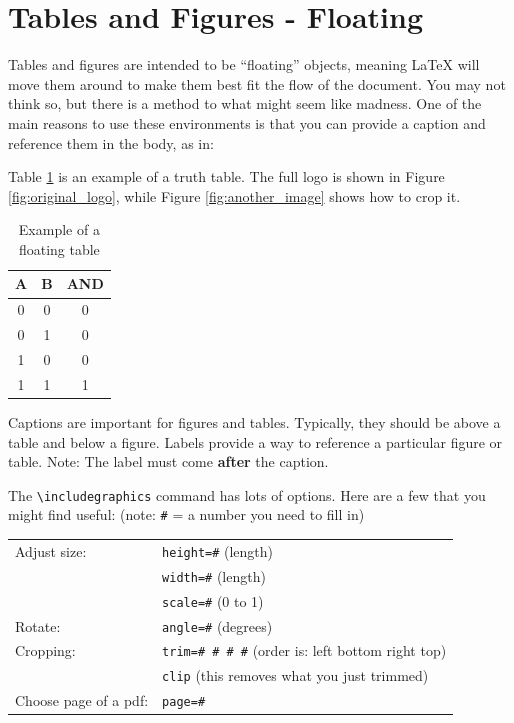 \documentclass[11pt]{article}
\begin{document}
\section*{Tables and Figures - Floating}

Tables and figures are intended to be ``floating'' objects, meaning LaTeX will move them around to make them best fit the flow of the document.  You may not think so, but there is a method to what might seem like madness. One of the main reasons to use these environments is that you can provide a caption and reference them in the body, as in: 

Table \ref{tbl:example_table} is an example of a truth table. The full logo is shown in Figure \ref{fig:original_logo}, while Figure \ref{fig:another_image} shows how to crop it.


\begin{table}[ht]\centering
	\caption{Example of a floating table}
	\label{tbl:example_table}
	\begin{tabular}{cc|c}
		\toprule
		A & B & AND \\
		\midrule
		0 & 0 & 0 \\
		0 & 1 & 0 \\
		1 & 0 & 0 \\
		1 & 1 & 1 \\
		\bottomrule
	\end{tabular} 
\end{table}

Captions are important for figures and tables.  Typically, they should be above a table and below a figure. Labels provide a way to reference a particular figure or table. Note: The label must come \textbf{after} the caption.  

The \verb|\includegraphics| command has lots of options.  Here are a few that you might find useful:  (note: \texttt{\#} = a number you need to fill in)

\begin{center}
	\begin{tabular}{ll}
		Adjust size:      		& \texttt{height=\#} (length) \\
								& \texttt{width=\#} (length) \\
								& \texttt{scale=\#} (0 to 1) \\
		Rotate:  				& \texttt{angle=\#} (degrees) \\
		Cropping:  				& \texttt{trim=\# \# \# \#} (order is: left bottom right top) \\
								& \texttt{clip} (this removes what you just trimmed) \\
		Choose page of a pdf: 	& \texttt{page=\#} \\
	\end{tabular}
\end{center}
\end{document}
